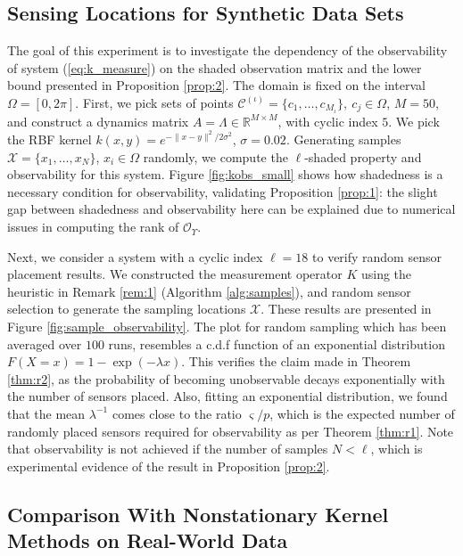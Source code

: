\documentclass[letterpaper,12pt,peerreviewca,draftcls]{IEEEtran}
\newcommand{\s}{\sigma}
\newcommand{\R}{\mathbb{R}}
\newcommand{\kernel}{k}
\newcommand{\empK}{\ensuremath{K}}
\newcommand{\dom}{\Omega}
\newcommand{\sampSet}{\mathcal{X}}
\newcommand{\sampSetLong}{\{x_1, \dots, x_{\nsamp}\}}
\newcommand{\nsamp}{N}
\newcommand{\ncent}{M}
\newcommand{\shCent}{\mathcal{C}}
\renewcommand{\eqref}[1]{(\ref{eq:#1})}
\newcommand{\Obs}{\mathcal{O}}
\newcommand{\Tset}{\Upsilon}
\newcommand{\JorLa}{\Lambda}
\newcommand{\minmeas}{\ell}
\newcommand{\dualop}{A}
\newcommand{\sampind}{i}
\newcommand{\centind}{j}
\newcommand{\setind}{\iota}
\newcommand{\rands}{\varsigma}
\begin{document}
\subsection{Sensing Locations for Synthetic Data Sets}\label{sec:exp}
The goal of this experiment is to investigate the dependency of the observability of system \eqref{k_measure} on the shaded observation matrix and the lower bound presented in Proposition \ref{prop:2}. The domain is fixed on the interval $\dom = [0,2\pi]$. First, we pick sets of points $\shCent^{(\setind)} = \{c_1,\dots,c_{\ncent_{\setind}}\}, \ c_{\centind}\in\dom$, $\ncent=50$, and construct a dynamics matrix $\dualop = \JorLa \in {\R^{\ncent \times \ncent}}$, with cyclic index $5$.  We pick the RBF kernel $\kernel(x,y) = e^{-\|x-y\|^2/2\s^2}$, $\s=0.02$. Generating samples $\sampSet=\sampSetLong$, $x_{\sampind}\in\dom$ randomly, we compute the $\minmeas$-shaded property and observability for this system. Figure \ref{fig:kobs_small} shows how shadedness is a necessary condition for observability, validating Proposition \ref{prop:1}: the slight gap between shadedness and observability here can be explained due to numerical issues in computing the rank of $\Obs_{\Tset}$. 
 
Next, we  consider a system with a cyclic index $\minmeas=18$ to verify random sensor placement results. We constructed the measurement operator $\empK$ using the heuristic in Remark \ref{rem:1} (Algorithm \ref{alg:samples}), and random sensor selection to generate the sampling locations $\sampSet$. These results are presented in Figure \ref{fig:sample_observability}. The plot for random sampling which has been averaged over $ 100 $ runs, resembles a c.d.f function of an exponential distribution $ F(X=x)=1-\exp(-\lambda x) $. This verifies the claim made in Theorem \ref{thm:r2}, as the probability of becoming unobservable decays exponentially with the number of sensors placed. Also, fitting an exponential distribution, we found that the mean $ \lambda^{-1}$ comes close to the ratio $ {\rands}/{p} $, which is the expected number of randomly placed sensors required for observability as per Theorem \ref{thm:r1}. Note that observability is not achieved if the number of samples $\nsamp < \minmeas$, which is experimental evidence of the result in Proposition \ref{prop:2}. 



\subsection[Comparison with Nonstationary Kernel Methods]{Comparison With Nonstationary Kernel Methods on Real-World Data}\label{sec:comparison}
\end{document}
